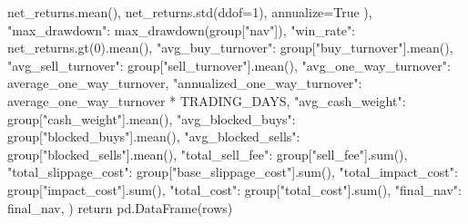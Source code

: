 \documentclass[UTF8,a4paper,fontset=fandol]{ctexart}
\begin{document}
\begin{ProjectCode}
{                net_returns.mean(), net_returns.std(ddof=1), annualize=True
            ),
            "max_drawdown": max_drawdown(group["nav"]),
            "win_rate": net_returns.gt(0).mean(),
            "avg_buy_turnover": group["buy_turnover"].mean(),
            "avg_sell_turnover": group["sell_turnover"].mean(),
            "avg_one_way_turnover": average_one_way_turnover,
            "annualized_one_way_turnover": average_one_way_turnover * TRADING_DAYS,
            "avg_cash_weight": group["cash_weight"].mean(),
            "avg_blocked_buys": group["blocked_buys"].mean(),
            "avg_blocked_sells": group["blocked_sells"].mean(),
            "total_sell_fee": group["sell_fee"].sum(),
            "total_slippage_cost": group["base_slippage_cost"].sum(),
            "total_impact_cost": group["impact_cost"].sum(),
            "total_cost": group["total_cost"].sum(),
            "final_nav": final_nav,
        })
    return pd.DataFrame(rows)



\end{ProjectCode}
\end{document}
